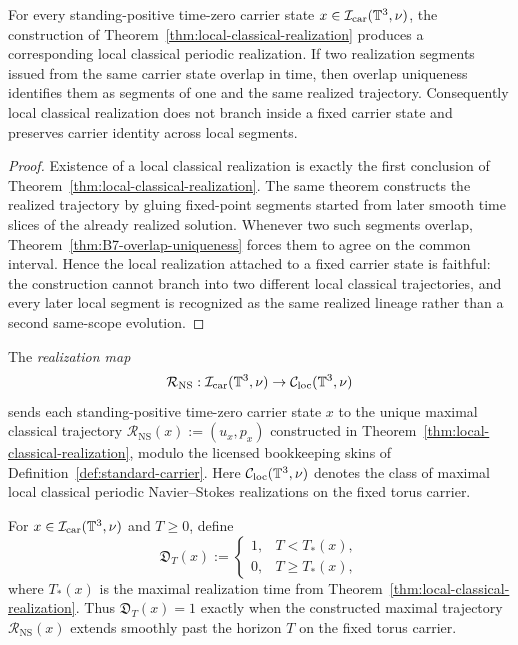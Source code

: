 \begin{manuallemma}
\label{lem:local-realization-faithful}
For every standing-positive time-zero carrier state $x\in\mathcal I_{\mathrm{car}}(\mathbb{T}^3,\nu)$, the construction of Theorem~\ref{thm:local-classical-realization} produces a corresponding local classical periodic realization. If two realization segments issued from the same carrier state overlap in time, then overlap uniqueness identifies them as segments of one and the same realized trajectory. Consequently local classical realization does not branch inside a fixed carrier state and preserves carrier identity across local segments.
\end{manuallemma}

\begin{proof}
Existence of a local classical realization is exactly the first conclusion of Theorem~\ref{thm:local-classical-realization}. The same theorem constructs the realized trajectory by gluing fixed-point segments started from later smooth time slices of the already realized solution. Whenever two such segments overlap, Theorem~\ref{thm:B7-overlap-uniqueness} forces them to agree on the common interval. Hence the local realization attached to a fixed carrier state is faithful: the construction cannot branch into two different local classical trajectories, and every later local segment is recognized as the same realized lineage rather than a second same-scope evolution.
\end{proof}

\begin{definition}\label{def:realization-map}
The \emph{realization map}
\[
\mathcal R_{\mathrm{NS}}:\mathcal I_{\mathrm{car}}(\mathbb{T}^3,\nu)\to \mathcal C_{\mathrm{loc}}(\mathbb{T}^3,\nu)
\]
sends each standing-positive time-zero carrier state $x$ to the unique maximal classical trajectory
$\mathcal R_{\mathrm{NS}}(x):=(u_x,p_x)$ constructed in
Theorem~\ref{thm:local-classical-realization}, modulo the licensed bookkeeping skins of
Definition~\ref{def:standard-carrier}. Here $\mathcal C_{\mathrm{loc}}(\mathbb{T}^3,\nu)$ denotes the class of
maximal local classical periodic Navier--Stokes realizations on the fixed torus carrier.
\end{definition}

\begin{definition}\label{def:horizon-continuation-discriminator}
For $x\in\mathcal I_{\mathrm{car}}(\mathbb{T}^3,\nu)$ and $T\ge 0$, define
\[
\mathfrak D_T(x):=
\begin{cases}
1,& T<T_*(x),\\
0,& T\ge T_*(x),
\end{cases}
\]
where $T_*(x)$ is the maximal realization time from
Theorem~\ref{thm:local-classical-realization}. Thus $\mathfrak D_T(x)=1$ exactly when the
constructed maximal trajectory $\mathcal R_{\mathrm{NS}}(x)$ extends smoothly past the horizon $T$ on
the fixed torus carrier.
\end{definition}

